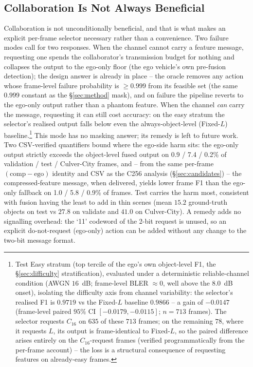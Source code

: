 \documentclass[journal]{IEEEtran}
\begin{document}
\subsection{Collaboration Is Not Always Beneficial}\label{sec:harm}

Collaboration is not unconditionally beneficial, and that is what makes an explicit per-frame selector necessary rather than a convenience. Two failure modes call for two responses. When the channel cannot carry a feature message, requesting one spends the collaborator's transmission budget for nothing and collapses the output to the ego-only floor (the ego vehicle's own pre-fusion detection); the design answer is already in place -- the oracle removes any action whose frame-level failure probability is $\ge 0.999$ from its feasible set (the same $0.999$ constant as the \S\ref{sec:method} mask), and on failure the pipeline reverts to the ego-only output rather than a phantom feature. When the channel \emph{can} carry the message, requesting it can still cost accuracy: on the easy stratum the selector's realised output falls below even the always-object-level (Fixed-$L$) baseline.\footnote{Test Easy stratum (top tercile of the ego's own object-level F1, the \S\ref{sec:difficulty} stratification), evaluated under a deterministic reliable-channel condition (AWGN $16$~dB; frame-level BLER ${\approx}0$, well above the $8.0$~dB onset), isolating the difficulty axis from channel variability: the selector's realised F1 is $0.9719$ vs the Fixed-$L$ baseline $0.9866$ -- a gain of $-0.0147$ (frame-level paired $95\%$ CI $[-0.0179,-0.0115]$; $n=713$ frames). The selector requests $C_{16}$ on $635$ of these $713$ frames; on the remaining $78$, where it requests $L$, its output is frame-identical to Fixed-$L$, so the paired difference arises entirely on the $C_{16}$-request frames (verified programmatically from the per-frame account) -- the loss is a structural consequence of requesting features on already-easy frames.} This mode has no masking answer; its remedy is left to future work. Two CSV-verified quantifiers bound where the ego-side harm sits: the ego-only output strictly exceeds the object-level fused output on 0.9 / 7.4 / 0.2\% of validation / test / Culver-City frames, and -- from the same per-frame $(\mathrm{comp}-\mathrm{ego})$ identity and CSV as the C256 analysis (\S\ref{sec:candidates}) -- the compressed-feature message, when delivered, yields lower frame F1 than the ego-only fallback on 1.0 / 5.8 / 0.9\% of frames. Test carries the harm most, consistent with fusion having the least to add in thin scenes (mean $15.2$ ground-truth objects on test vs $27.8$ on validate and $41.0$ on Culver-City). A remedy adds no signalling overhead: the `11' codeword of the 2-bit request is unused, so an explicit do-not-request (ego-only) action can be added without any change to the two-bit message format.
\end{document}
